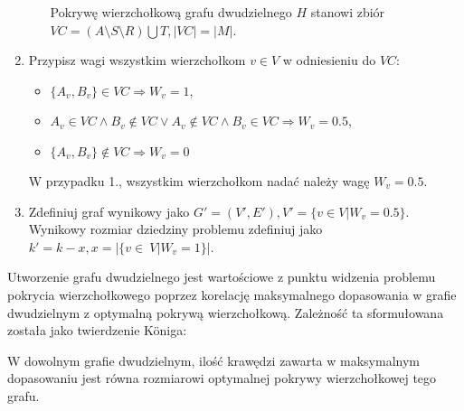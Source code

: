 \begin{enumerate}
\begin{itemize}
        Pokrywę wierzchołkową grafu dwudzielnego $H$ stanowi zbiór 
        ${VC=(A \setminus S \setminus R) \bigcup T}, |VC|=|M|$.
    \end{itemize}
  \item Przypisz wagi wszystkim wierzchołkom $v \in V$ w odniesieniu do $VC$:
    \begin{itemize}
      \item $\{A_v, B_v\} \in VC \Rightarrow W_v=1$,
      \item $A_v \in VC \land B_v \notin VC \lor A_v \notin VC \land B_v \in
        VC \Rightarrow W_v=0.5$,
      \item $\{A_v, B_v\} \notin VC \Rightarrow W_v=0$
    \end{itemize}
    W przypadku 1., wszystkim wierzchołkom nadać należy wagę $W_v=0.5$.
  \item Zdefiniuj graf wynikowy jako 
    $G\prime=(V\prime, E\prime), V\prime=\{v \in V|W_v=0.5\}$.
    Wynikowy rozmiar dziedziny problemu zdefiniuj jako 
    ${k\prime=k-x, x=|\{v\in~V|W_v=1\}}|$.
\end{enumerate}

Utworzenie grafu dwudzielnego jest wartościowe z punktu widzenia problemu
pokrycia wierzchołkowego poprzez korelację maksymalnego dopasowania w grafie
dwudzielnym z optymalną pokrywą wierzchołkową. 
Zależność ta sformułowana została jako twierdzenie K\"oniga:

\begin{konig*}
  W dowolnym grafie dwudzielnym, ilość krawędzi zawarta w maksymalnym
  dopasowaniu jest równa rozmiarowi optymalnej pokrywy wierzchołkowej tego
  grafu.
\end{konig*}

